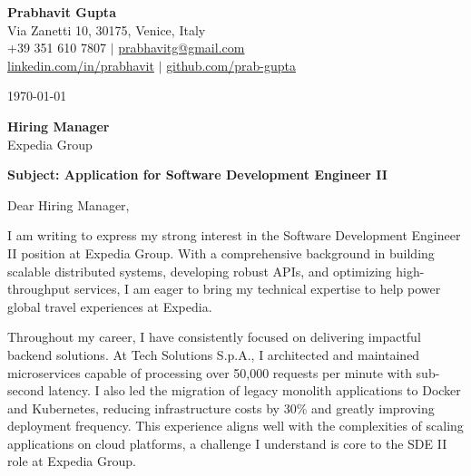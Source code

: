\documentclass[11pt,a4paper]{article}
\begin{document}
\begin{center}
    {\LARGE \textbf{Prabhavit Gupta}} \\
    \vspace{5pt}
    Via Zanetti 10, 30175, Venice, Italy \\
    +39 351 610 7807 $\mid$ \href{mailto:prabhavitg@gmail.com}{prabhavitg@gmail.com} \\
    \href{https://www.linkedin.com/in/prabhavit/}{linkedin.com/in/prabhavit} $\mid$ \href{https://github.com/prab-gupta}{github.com/prab-gupta}
\end{center}

\vspace{15pt}

\today

\vspace{15pt}

\noindent
\textbf{Hiring Manager} \\
Expedia Group \\

\vspace{15pt}

\noindent
\textbf{Subject: Application for Software Development Engineer II}

\vspace{15pt}

\noindent
Dear Hiring Manager,

\vspace{10pt}

\noindent
I am writing to express my strong interest in the Software Development Engineer II position at Expedia Group. With a comprehensive background in building scalable distributed systems, developing robust APIs, and optimizing high-throughput services, I am eager to bring my technical expertise to help power global travel experiences at Expedia.

\vspace{10pt}

\noindent
Throughout my career, I have consistently focused on delivering impactful backend solutions. At Tech Solutions S.p.A., I architected and maintained microservices capable of processing over 50,000 requests per minute with sub-second latency. I also led the migration of legacy monolith applications to Docker and Kubernetes, reducing infrastructure costs by 30\% and greatly improving deployment frequency. This experience aligns well with the complexities of scaling applications on cloud platforms, a challenge I understand is core to the SDE II role at Expedia Group.
\end{document}
